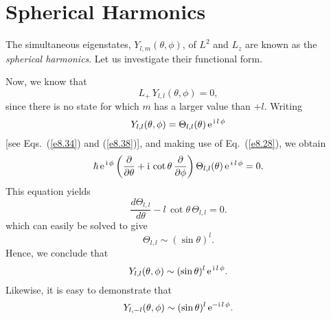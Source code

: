 \section{Spherical Harmonics}\label{sharm}
The simultaneous eigenstates, $Y_{l,m}(\theta,\phi)$, of $L^2$ and $L_z$
are known as the {\em spherical harmonics}. Let us investigate their
functional form.

Now, we know that
\begin{equation}
L_+\,Y_{l,l}(\theta,\phi) = 0,
\end{equation}
since there is no state for which $m$ has a larger value than $+l$. 
Writing
\begin{equation}
Y_{l,l}(\theta,\phi) = \Theta_{l,l}(\theta)\,{\rm e}^{\,{\rm i}\,l\,\phi}
\end{equation}
[see Eqs.~(\ref{e8.34}) and (\ref{e8.38})], and making use of
Eq.~(\ref{e8.28}), we obtain
\begin{equation}
\hbar\,{\rm e}^{\,{\rm i}\,\phi}\left(\frac{\partial}{\partial\theta} + {\rm i}\,\cot\theta\,\frac{\partial}{\partial\phi}\right)\Theta_{l,l}(\theta)\,{\rm e}^{\,i\,l\,\phi}=0.
\end{equation}
This equation yields
\begin{equation}
\frac{d\Theta_{l,l}}{d\theta} - l\,\cot\theta\,\Theta_{l,l} = 0.
\end{equation}
which can easily be solved to give
\begin{equation}
\Theta_{l,l}\sim (\sin\theta)^l.
\end{equation}
Hence, we conclude that
\begin{equation}\label{e8.59}
Y_{l,l}(\theta,\phi) \sim (\sin\theta)^l\,{\rm e}^{\,{\rm i}\,l\,\phi}.
\end{equation}
Likewise, it is easy to demonstrate that
\begin{equation}\label{e8.60}
Y_{l,-l}(\theta,\phi) \sim (\sin\theta)^l\,{\rm e}^{-{\rm i}\,l\,\phi}.
\end{equation}


